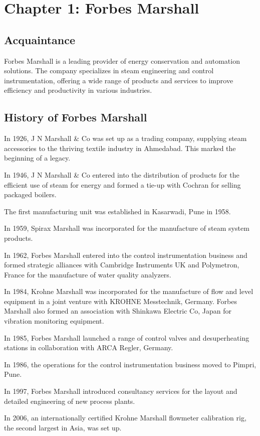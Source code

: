 \section {Chapter 1: Forbes Marshall}
\subsection{Acquaintance}
Forbes Marshall is a leading provider of energy conservation and automation solutions. The company specializes in steam engineering and control instrumentation, offering a wide range of products and services to improve efficiency and productivity in various industries.\cite{report_fm}

\subsection{History of Forbes Marshall}
In 1926, J N Marshall \& Co was set up as a trading company, supplying steam accessories to the thriving textile industry in Ahmedabad. This marked the beginning of a legacy.

In 1946, J N Marshall \& Co entered into the distribution of products for the efficient use of steam for energy and formed a tie-up with Cochran for selling packaged boilers.

The first manufacturing unit was established in Kasarwadi, Pune in 1958.

In 1959, Spirax Marshall was incorporated for the manufacture of steam system products.

In 1962, Forbes Marshall entered into the control instrumentation business and formed strategic alliances with Cambridge Instruments UK and Polymetron, France for the manufacture of water quality analyzers.

In 1984, Krohne Marshall was incorporated for the manufacture of flow and level equipment in a joint venture with KROHNE Messtechnik, Germany. Forbes Marshall also formed an association with Shinkawa Electric Co, Japan for vibration monitoring equipment.

In 1985, Forbes Marshall launched a range of control valves and desuperheating stations in collaboration with ARCA Regler, Germany.

In 1986, the operations for the control instrumentation business moved to Pimpri, Pune.

In 1997, Forbes Marshall introduced consultancy services for the layout and detailed engineering of new process plants.

In 2006, an internationally certified Krohne Marshall flowmeter calibration rig, the second largest in Asia, was set up.

